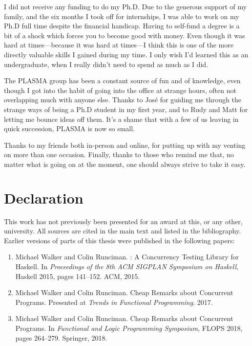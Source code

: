 I did not receive any funding to do my Ph.D.  Due to the generous
support of my family, and the six months I took off for internships, I
was able to work on my Ph.D full time despite the financial handicap.
Having to self-fund a degree is a bit of a shock which forces you to
become good with money.  Even though it was hard at times---because it
was hard at times---I think this is one of the more directly valuable
skills I gained during my time.  I only wish I'd learned this as an
undergraduate, when I really didn't need to spend as much as I did.

The PLASMA group has been a constant source of fun and of knowledge,
even though I got into the habit of going into the office at strange
hours, often not overlapping much with anyone else.  Thanks to Jos\'e
for guiding me through the strange ways of being a Ph.D student in my
first year, and to Rudy and Matt for letting me bounce ideas off them.
It's a shame that with a few of us leaving in quick succession, PLASMA
is now so small.

Thanks to my friends both in-person and online, for putting up with my
venting on more than one occasion.  Finally, thanks to those who
remind me that, no matter what is going on at the moment, one should
always strive to take it easy.

\chapter*{Declaration}

This work has not previously been presented for an award at this, or
any other, university.  All sources are cited in the main text and
listed in the bibliography.  Earlier versions of parts of this thesis
were published in the following papers:

\begin{enumerate}
\item Michael Walker and Colin Runciman.  \dejafu{}: A Concurrency
  Testing Library for Haskell.  In \emph{Proceedings of the 8th ACM
    SIGPLAN Symposium on Haskell}, Haskell 2015, pages 141--152.  ACM,
  2015.\nocite{walker2015}
\item Michael Walker and Colin Runciman.  Cheap Remarks about
  Concurrent Programs.  Presented at \emph{Trends in Functional
    Programming}.  2017.\nocite{tfp-coco}
\item Michael Walker and Colin Runciman.  Cheap Remarks about
  Concurrent Programs.  In \emph{Functional and Logic Programming
    Symposium}, FLOPS 2018, pages 264--279.  Springer,
  2018.\nocite{walker2018}
\end{enumerate}

